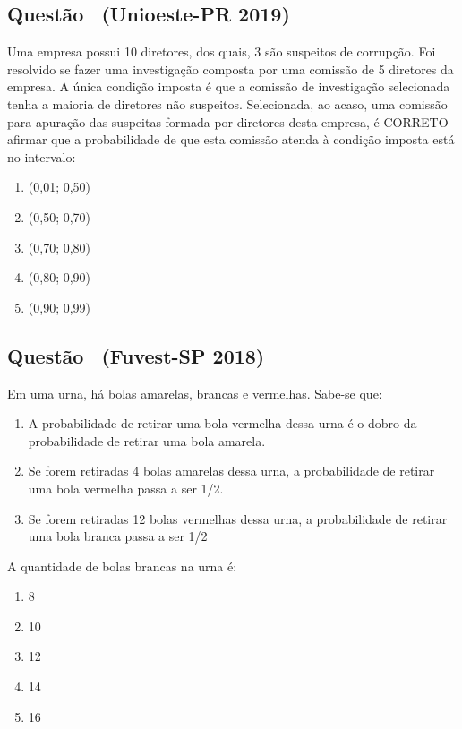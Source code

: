 \documentclass[12pt]{article}
\newcounter{questao}
\newcommand{\novaquestao}[1]{%
  \stepcounter{questao}%
  \subsection*{Questão \thequestao\ (#1)}%
}
\begin{document}
\begin{multicols}{2}
        \novaquestao{Unioeste-PR 2019}

            Uma empresa possui 10 diretores, dos quais, 3 são suspeitos de corrupção. Foi 
            resolvido se fazer uma investigação composta por uma comissão de 5 diretores da 
            empresa. A única condição imposta é que a comissão de investigação selecionada 
            tenha a maioria de diretores não suspeitos. Selecionada, ao acaso, uma comissão para 
            apuração das suspeitas formada por diretores desta empresa, é CORRETO afirmar que a 
            probabilidade de que esta comissão atenda à condição imposta está no intervalo:

            \begin{enumerate}[label=(\alph*), noitemsep]
                \item (0,01; 0,50)
                \item (0,50; 0,70)
                \item (0,70; 0,80)
                \item (0,80; 0,90)
                \item (0,90; 0,99)
            \end{enumerate}
        
        \novaquestao{Fuvest-SP 2018}
            
            Em uma urna, há bolas amarelas, brancas e vermelhas. Sabe-se que:

            \begin{enumerate}[label=\Roman*.]
                \item A probabilidade de retirar uma bola vermelha dessa urna é o dobro da 
                probabilidade de retirar uma bola amarela.
                \item Se forem retiradas 4 bolas amarelas dessa urna, a probabilidade de 
                retirar uma bola vermelha passa a ser {1}/{2}.
                \item Se forem retiradas 12 bolas vermelhas dessa urna, a probabilidade de 
                retirar uma bola branca passa a ser {1}/{2}
            \end{enumerate} A quantidade de bolas brancas na urna é:

            
            \begin{enumerate}[label=(\alph*), noitemsep]
                \item 8
                \item 10
                \item 12
                \item 14
                \item 16
            \end{enumerate}
        

\end{multicols}
\end{document}
